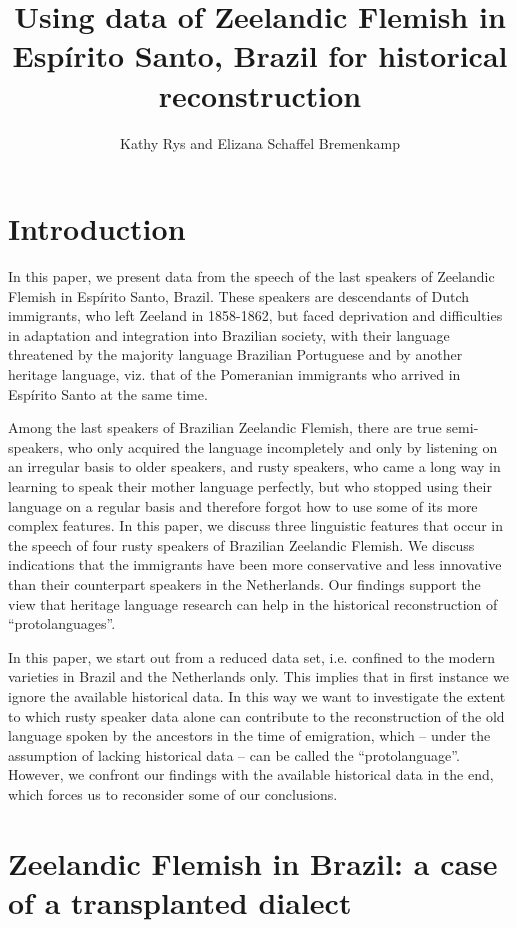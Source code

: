 \documentclass[output=paper,hidelinks,draftmode]{langscibook}
\author{Kathy Rys \affiliation{Dutch Language Institute (INT), Leiden; Meertens Institute, Amsterdam} and Elizana Schaffel Bremenkamp\affiliation{{Stricto Sensu} Post-Graduate Linguistics Program of the Federal University of Espírito Santo, Brazil}}
\title{Using data of Zeelandic Flemish in Espírito Santo, Brazil for historical reconstruction}
\begin{document}
\maketitle 
{}%


\section{Introduction}
\largerpage[-1]
In this paper, we present data from the speech of the last speakers of Zeelandic Flemish in Espírito Santo, Brazil. These speakers are descendants of Dutch immigrants, who left Zeeland in 1858-1862, but faced deprivation and difficulties in adaptation and integration into Brazilian society, with their language threatened by the majority language Brazilian Portuguese and by another heritage language, viz. that of the Pomeranian immigrants who arrived in Espírito Santo at the same time.

Among the last speakers of Brazilian Zeelandic Flemish, there are true semi-speakers, who only acquired the language incompletely and only by listening on an irregular basis to older speakers, and rusty speakers, who came a long way in learning to speak their mother language perfectly, but who stopped using their language on a regular basis and therefore forgot how to use some of its more complex features. In this paper, we discuss three linguistic features that occur in the speech of four rusty speakers of Brazilian Zeelandic Flemish. We discuss indications that the immigrants have been more conservative and less innovative than their counterpart speakers in the Netherlands. Our findings support the view that heritage language research can help in the historical reconstruction of ``protolanguages''.

In this paper, we start out from a reduced data set, i.e. confined to the modern varieties in Brazil and the Netherlands only. This implies that in first instance we ignore the available historical data. In this way we want to investigate the extent to which rusty speaker data alone can contribute to the reconstruction of the old language spoken by the ancestors in the time of emigration, which – under the assumption of lacking historical data – can be called the ``protolanguage''. However, we confront our findings with the available historical data in the end, which forces us to reconsider some of our conclusions.

\section{Zeelandic Flemish in Brazil: a case of a transplanted dialect} 
\largerpage[-1]
\end{document}
